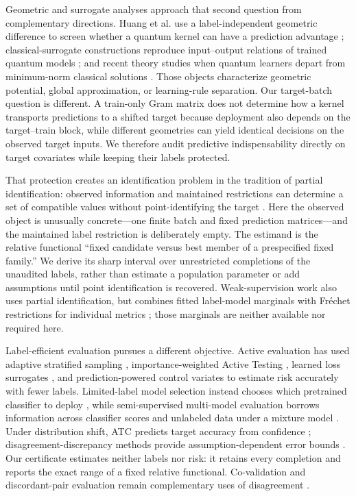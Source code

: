 \documentclass[referee,lineno,pdflatex,sn-nature]{sn-jnl}
\theoremstyle{thmstyleone}%
\theoremstyle{thmstyletwo}%
\theoremstyle{thmstylethree}%
\begin{document}
Geometric and surrogate analyses approach that second question from complementary directions. Huang et al. use a label-independent geometric difference to screen whether a quantum kernel can have a prediction advantage \cite{huang2021powerofdata}; classical-surrogate constructions reproduce input--output relations of trained quantum models \cite{schreiber2023surrogates}; and recent theory studies when quantum learners depart from minimum-norm classical solutions \cite{thabet2026disagree}. Those objects characterize geometric potential, global approximation, or learning-rule separation. Our target-batch question is different. A train-only Gram matrix does not determine how a kernel transports predictions to a shifted target because deployment also depends on the target--train block, while different geometries can yield identical decisions on the observed target inputs. We therefore audit predictive indispensability directly on target covariates while keeping their labels protected.

That protection creates an identification problem in the tradition of partial identification: observed information and maintained restrictions can determine a set of compatible values without point-identifying the target \cite{manski2003partialidentification,molinari2020microeconometrics}. Here the observed object is unusually concrete---one finite batch and fixed prediction matrices---and the maintained label restriction is deliberately empty. The estimand is the relative functional ``fixed candidate versus best member of a prespecified fixed family.'' We derive its sharp interval over unrestricted completions of the unaudited labels, rather than estimate a population parameter or add assumptions until point identification is recovered. Weak-supervision work also uses partial identification, but combines fitted label-model marginals with Fr\'echet restrictions for individual metrics \cite{polo2024partialidentification}; those marginals are neither available nor required here.

Label-efficient evaluation pursues a different objective. Active evaluation has used adaptive stratified sampling \cite{katariya2012activeevaluation}, importance-weighted Active Testing \cite{kossen2021activetesting}, learned loss surrogates \cite{kossen2022activesurrogate}, and prediction-powered control variates \cite{ashouritaklimi2026predictionpowered} to estimate risk accurately with fewer labels. Limited-label model selection instead chooses which pretrained classifier to deploy \cite{okanovic2025modelselector}, while semi-supervised multi-model evaluation borrows information across classifier scores and unlabeled data under a mixture model \cite{shanmugam2025evaluating}. Under distribution shift, ATC predicts target accuracy from confidence \cite{garg2022leveraging}; disagreement-discrepancy methods provide assumption-dependent error bounds \cite{rosenfeld2023disagreement,mishra2025odd}. Our certificate estimates neither labels nor risk: it retains every completion and reports the exact range of a fixed relative functional. Co-validation and discordant-pair evaluation remain complementary uses of disagreement \cite{madani2004covalidation,musgrove2023discordant}.
\end{document}
